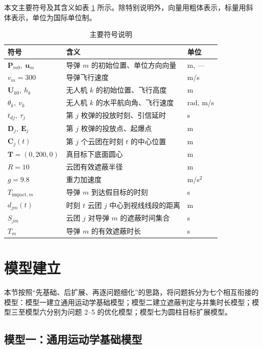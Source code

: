 \documentclass[11pt,a4paper]{ctexart}
\begin{document}
本文主要符号及其含义如表 \ref{tab:symbol} 所示。除特别说明外，向量用粗体表示，标量用斜体表示，单位为国际单位制。

\begin{table}[H]
\centering
\caption{主要符号说明}
\label{tab:symbol}
\small
\begin{tabular}{lll}
\toprule
符号 & 含义 & 单位 \\
\midrule
$\bm{P}_{m0},\ \bm{u}_m$ & 导弹 $m$ 的初始位置、单位方向向量 & m, --- \\
$v_m=300$ & 导弹飞行速度 & m/s \\
$\bm{U}_{k0},\ h_k$ & 无人机 $k$ 的初始位置、飞行高度 & m \\
$\theta_k,\ v_k$ & 无人机 $k$ 的水平航向角、飞行速度 & rad, m/s \\
$t_{dj},\ \tau_j$ & 第 $j$ 枚弹的投放时刻、引信延时 & s \\
$\bm{D}_j,\ \bm{E}_j$ & 第 $j$ 枚弹的投放点、起爆点 & m \\
$\bm{C}_j(t)$ & 第 $j$ 个云团在时刻 $t$ 的中心位置 & m \\
$\bm{T}=(0,200,0)$ & 真目标下底面圆心 & m \\
$R=10$ & 云团有效遮蔽半径 & m \\
$g=9.8$ & 重力加速度 & m/s$^2$ \\
$T_{\mathrm{impact},m}$ & 导弹 $m$ 到达假目标的时刻 & s \\
$d_{jm}(t)$ & 时刻 $t$ 云团 $j$ 中心到视线线段的距离 & m \\
$S_{jm}$ & 云团 $j$ 对导弹 $m$ 的遮蔽时间集合 & s \\
$T_m$ & 导弹 $m$ 的有效遮蔽时长 & s \\
\bottomrule
\end{tabular}
\end{table}

\section{模型建立}

本节按照“先基础、后扩展、再逐问题细化”的思路，将问题拆分为七个相互衔接的模型：模型一建立通用运动学基础模型；模型二建立遮蔽判定与并集时长模型；模型三至模型六分别为问题 2--5 的优化模型；模型七为圆柱目标扩展模型。

\subsection{模型一：通用运动学基础模型}
\end{document}
